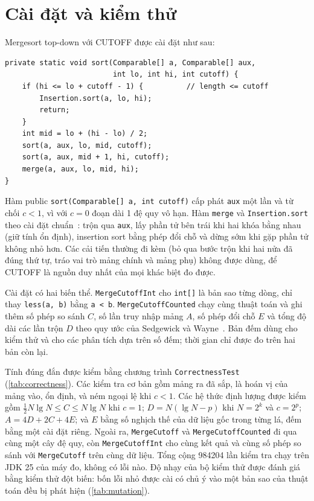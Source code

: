 \documentclass[12pt,a4paper]{article}
\begin{document}
\section{Cài đặt và kiểm thử}\label{sec:3}
Mergesort top-down với CUTOFF được cài đặt như sau:
\begin{verbatim}
private static void sort(Comparable[] a, Comparable[] aux,
                         int lo, int hi, int cutoff) {
    if (hi <= lo + cutoff - 1) {          // length <= cutoff
        Insertion.sort(a, lo, hi);
        return;
    }
    int mid = lo + (hi - lo) / 2;
    sort(a, aux, lo, mid, cutoff);
    sort(a, aux, mid + 1, hi, cutoff);
    merge(a, aux, lo, mid, hi);
}
\end{verbatim}
Hàm public \texttt{sort(Comparable[] a, int cutoff)} cấp phát \texttt{aux} một lần và từ chối $c < 1$, vì với $c = 0$ đoạn dài 1 đệ quy vô hạn. Hàm \texttt{merge} và \texttt{Insertion.sort} theo cài đặt chuẩn~\citep{sedgewick2011}: trộn qua \texttt{aux}, lấy phần tử bên trái khi hai khóa bằng nhau (giữ tính ổn định), insertion sort bằng phép đổi chỗ và dừng sớm khi gặp phần tử không nhỏ hơn. Các cải tiến thường đi kèm (bỏ qua bước trộn khi hai nửa đã đúng thứ tự, tráo vai trò mảng chính và mảng phụ) không được dùng, để CUTOFF là nguồn duy nhất của mọi khác biệt đo được.

Cài đặt có hai biến thể. \texttt{MergeCutoffInt} cho \texttt{int[]} là bản sao từng dòng, chỉ thay \texttt{less(a, b)} bằng \texttt{a < b}. \texttt{MergeCutoffCounted} chạy cùng thuật toán và ghi thêm số phép so sánh $C$, số lần truy nhập mảng $A$, số phép đổi chỗ $E$ và tổng độ dài các lần trộn $D$ theo quy ước của Sedgewick và Wayne~\citep{sedgewick2011}. Bản đếm dùng cho kiểm thử và cho các phân tích dựa trên số đếm; thời gian chỉ được đo trên hai bản còn lại.

Tính đúng đắn được kiểm bằng chương trình \texttt{CorrectnessTest} (\cref{tab:correctness}). Các kiểm tra cơ bản gồm mảng ra đã sắp, là hoán vị của mảng vào, ổn định, và ném ngoại lệ khi $c < 1$. Các hệ thức định lượng được kiểm gồm $\tfrac12 N \lg N \le C \le N \lg N$ khi $c = 1$; $D = N(\lg N - p)$ khi $N = 2^k$ và $c = 2^p$; $A = 4D + 2C + 4E$; và $E$ bằng số nghịch thế của dữ liệu gốc trong từng lá, đếm bằng một cài đặt riêng. Ngoài ra, \texttt{MergeCutoff} và \texttt{MergeCutoffCounted} đi qua cùng một cây đệ quy, còn \texttt{MergeCutoffInt} cho cùng kết quả và cùng số phép so sánh với \texttt{MergeCutoff} trên cùng dữ liệu. Tổng cộng \num{984204} lần kiểm tra chạy trên JDK 25 của máy đo, không có lỗi nào. Độ nhạy của bộ kiểm thử được đánh giá bằng kiểm thử đột biến: bốn lỗi nhỏ được cài có chủ ý vào một bản sao của thuật toán đều bị phát hiện (\cref{tab:mutation}).
\end{document}
